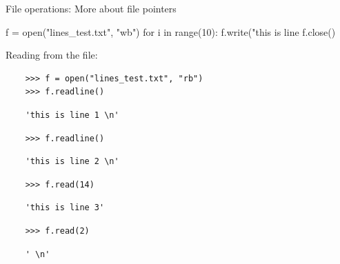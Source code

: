 \documentclass[xcolor=table,10pt,handout]{beamer}
\begin{document}
\begin{frame}[fragile]{File operations: More about file pointers}

  \begin{mlinepython}
    f = open("lines_test.txt", "wb")
    for i in range(10):
        f.write("this is line %
    f.close()
  \end{mlinepython}
  \pause
  \bigskip

  Reading from the file:
  \smallskip

  \begin{verbatim}
    >>> f = open("lines_test.txt", "rb")
    >>> f.readline()
  \end{verbatim}
  \pause
  \vspace{-10pt}
  \begin{verbatim}
    'this is line 1 \n'
  \end{verbatim}
  \pause
  \vspace{-10pt}
  \begin{verbatim}
    >>> f.readline()
  \end{verbatim}
  \pause
  \vspace{-10pt}
  \begin{verbatim}
    'this is line 2 \n'
  \end{verbatim}
  \pause
  \vspace{-10pt}
  \begin{verbatim}
    >>> f.read(14)
  \end{verbatim}
  \pause
  \vspace{-10pt}
  \begin{verbatim}
    'this is line 3'
  \end{verbatim}
  \pause
  \vspace{-10pt}
  \begin{verbatim}
    >>> f.read(2)
  \end{verbatim}
  \pause
  \vspace{-10pt}
  \begin{verbatim}
    ' \n'
  \end{verbatim}

\end{frame}
\end{document}
